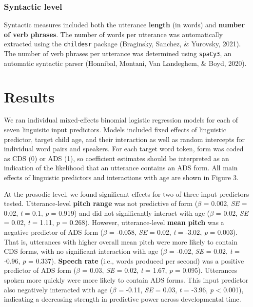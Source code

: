 \documentclass[10pt, letterpaper]{article}
\begin{document}
\hypertarget{syntactic-level}{%
\subsubsection{Syntactic level}\label{syntactic-level}}

Syntactic measures included both the utterance \textbf{length} (in
words) and \textbf{number of verb phrases}. The number of words per
utterance was automatically extracted using the \texttt{childesr}
package (Braginsky, Sanchez, \& Yurovsky, 2021). The number of verb
phrases per utterance was determined using \texttt{spaCy3}, an automatic
syntactic parser (Honnibal, Montani, Van Landeghem, \& Boyd, 2020).

\hypertarget{results-1}{%
\section{Results}\label{results-1}}

We ran individual mixed-effects binomial logistic regression models for
each of seven linguisitc input predictors. Models included fixed effects
of linguistic predictor, target child age, and their interaction as well
as random intercepts for individual word pairs and speakers. For each
target word token, form was coded as CDS (0) or ADS (1), so coefficient
estimates should be interpreted as an indication of the likelihood that
an utterance contains an ADS form. All main effects of linguistic
predictors and interactions with age are shown in Figure 3.

At the prosodic level, we found significant effects for two of three
input predictors tested. Utterance-level \textbf{pitch range} was not
predictive of form (\(\beta\) = 0.002, \emph{SE} = 0.02, \emph{t} = 0.1,
\emph{p} = 0.919) and did not significantly interact with age (\(\beta\)
= 0.02, \emph{SE} = 0.02, \emph{t} = 1.11, \emph{p} = 0.268). However,
utterance-level \textbf{mean pitch} was a negative predictor of ADS form
(\(\beta\) = -0.058, \emph{SE} = 0.02, \emph{t} = -3.02, \emph{p} =
0.003). That is, utterances with higher overall mean pitch were more
likely to contain CDS forms, with no significant interaction with age
(\(\beta\) = -0.02, \emph{SE} = 0.02, \emph{t} = -0.96, \emph{p} =
0.337). \textbf{Speech rate} (i.e., words produced per second) was a
positive predictor of ADS form (\(\beta\) = 0.03, \emph{SE} = 0.02,
\emph{t} = 1.67, \emph{p} = 0.095). Utterances spoken more quickly were
more likely to contain ADS forms. This input predictor also negatively
interacted with age (\(\beta\) = -0.11, \emph{SE} = 0.03, \emph{t} =
-3.96, \emph{p} \textless{} 0.001), indicating a decreasing strength in
predictive power across developmental time.
\end{document}
